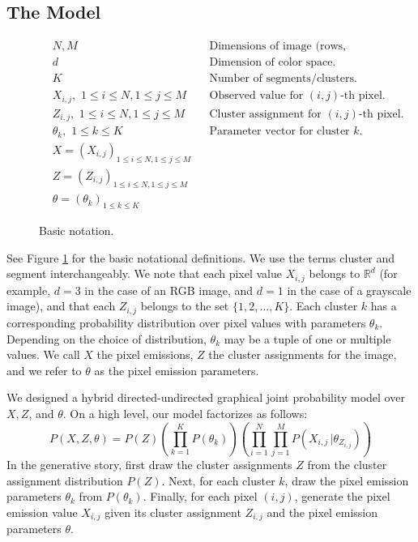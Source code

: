 \documentclass[12pt]{article}
\begin{document}
\subsection*{The Model}
\begin{figure}
\begin{align*}
&N, M \qquad &&\text{Dimensions of image (rows, columns).}\\
&d \qquad &&\text{Dimension of color space.}\\
&K \qquad &&\text{Number of segments/clusters.}\\
&X_{i,j}, \,\, 1\leq i \leq N, 1\leq j \leq M &&\text{Observed value for $(i,j)$-th pixel.}\\
&Z_{i,j}, \,\, 1\leq i \leq N, 1\leq j \leq M &&\text{Cluster assignment for $(i,j)$-th pixel.}\\
&\theta_k,\,\, 1\leq k \leq K &&\text{Parameter vector for cluster $k$.}\\
&X = (X_{i,j})_{1\leq i \leq N, 1 \leq j \leq M}\\
&Z = (Z_{i,j})_{1\leq i \leq N, 1 \leq j \leq M}\\
&\theta = (\theta_k)_{1\leq k \leq K}
\end{align*}
\caption{Basic notation.}
\label{equations}
\end{figure}
See Figure \ref{equations} for the basic notational definitions.
We use the terms cluster and segment interchangeably.
We note that each pixel value $X_{i,j}$ belongs to $\mathbb{R}^d$
(for example, $d=3$ in the case of an RGB image, and $d=1$ in the case
of a grayscale image), and that each $Z_{i,j}$ belongs to the set
$\{1,2,\ldots,K\}$.
Each cluster $k$ has a corresponding probability distribution over pixel values
with parameters $\theta_k$. Depending on the choice of distribution,
$\theta_k$ may be a tuple of one or multiple values.
We call $X$ the pixel emissions, $Z$ the cluster assignments for the image, and
we refer to $\theta$ as the pixel emission parameters.

We designed a hybrid directed-undirected graphical joint probability model over $X, Z$, and $\theta$.
On a high level, our model factorizes as follows:
\[
P(X,Z,\theta) = P(Z)\left(\prod_{k=1}^KP(\theta_k)\right)
\left(\prod_{i=1}^N\prod_{j=1}^MP(X_{i,j}\,|\theta_{Z_{i,j}})\right)
\]
In the generative story,
first draw the cluster assignments $Z$ from the cluster assignment distribution $P(Z)$.
Next, for each cluster $k$, draw the pixel emission parameters $\theta_k$ from $P(\theta_k)$.
Finally, for each pixel $(i,j)$, generate the pixel emission value $X_{i,j}$ given its
cluster assignment $Z_{i,j}$ and the pixel emission parameters $\theta$.
\end{document}

